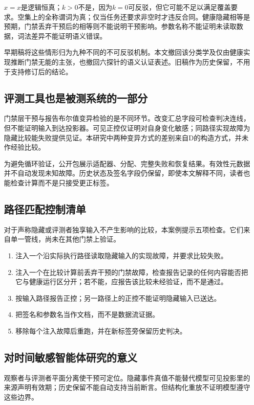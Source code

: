 \documentclass[UTF8,11pt]{ctexart}
\begin{document}
\(x=x\)是逻辑恒真；\(k>0\)不是，因为\(k=0\)可反驳，但它可能不足以满足覆盖要求。空集上的全称谓词为真；仅当任务还要求非空时才违反合同。健康隐藏相等是预期，门禁丢弃干预后的相等则不能说明干预影响。参数名称不能证明未读取数据，词法差异不能证明语义错误。

早期稿将这些情形归为九种不同的不可反驳机制。本文撤回该分类学及仅由健康实现推断门禁无能的主张，也撤回六探针的语义认证表述。旧稿作为历史保留，不用于支持修订后的结论。

\subsection{评测工具也是被测系统的一部分}
门禁层干预与报告布尔值变异检验的是不同环节。改变汇总字段可检查判决连线，但不能证明输入到达投影器。可见正控仅证明对自身变化敏感；同路径实现故障为隐藏比较能失败提供见证。本研究中两种变异方式的差别来自D的构造方式，并未作经验比较。

为避免循环验证，公开包展示适配器、分配、完整失败和恢复结果。有效性元数据并不自动发现未知故障。历史状态及签名字段仍保留，即使本文解释不同，读者也能检查计算而不是只接受更正标签。

\subsection{路径匹配控制清单}
对于声称隐藏或评测者独享输入不产生影响的比较，本案例提示五项检查。它们来自单一管线，尚未在其他门禁上验证。
\begin{enumerate}
\item 注入一个沿实际执行路径读取隐藏输入的实现故障，并要求比较失败。
\item 注入一个在比较计算前丢弃干预的门禁故障，检查报告记录的任何内容能否把它与健康运行区分开；若不能，应报告该比较未经验证，而不是通过。
\item 按输入路径报告正控；另一路径上的正控不能证明隐藏输入已送达。
\item 把签名和参数名当作文档，而不是数据流证据。
\item 移除每个注入故障后重跑，并在新标签旁保留历史判决。
\end{enumerate}

\subsection{对时间敏感智能体研究的意义}
观察者与评测者平面分离使干预可定位。隐藏事件真值不能替代模型可见投影里的来源声明有效期；历史保留不能自动支持当前断言。但结构化重放不证明模型遵守这些边界。
\end{document}
